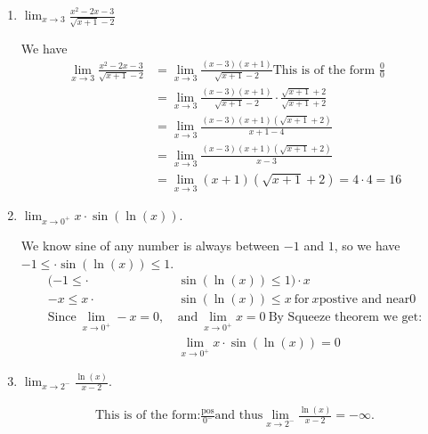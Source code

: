 \documentclass[nooutcomes]{ximera}
\begin{document}
\begin{problem}
	\begin{enumerate}
  \item
      $\displaystyle \lim_{x \to 3} \frac{x^2 - 2x - 3}{\sqrt{x+1} - 2}$
      \begin{freeResponse}
        We have
        \begin{align*}
          \lim_{x \to 3} \frac{x^2 - 2x - 3}{\sqrt{x+1} - 2} &= \lim_{x \to 3} \frac{(x- 3)(x + 1)}{\sqrt{x+1} - 2} \text{This is of the form $\frac{0}{0}$} \\
          &= \lim_{x \to 3} \frac{(x- 3)(x + 1)}{\sqrt{x+1} - 2} \cdot \frac{\sqrt{x+1} + 2}{\sqrt{x+1} + 2}\\
          &= \lim_{x \to 3} \frac{(x- 3)(x + 1)(\sqrt{x+1} + 2)}{x+1 - 4}\\
          &= \lim_{x \to 3} \frac{(x- 3)(x + 1)(\sqrt{x+1} + 2)}{x-3}\\
          &= \lim_{x \to 3} (x + 1)(\sqrt{x+1} + 2) = 4 \cdot 4 = 16
        \end{align*}
      \end{freeResponse}


    \item
      $\displaystyle \lim_{x \to 0^+} x \cdot \sin(\ln(x))$.
      \begin{freeResponse}
	We know sine of any number is always between $-1$ and $1$, so we have $-1 \le  \cdot \sin(\ln(x)) \le 1$.
	\begin{align*}
	(-1 \le  \cdot& \sin(\ln(x)) \le 1) \cdot x\\
       	-x \le x \cdot& \sin(\ln(x)) \le x\ \text{for}\ x \text{postive and near} 0\\
	\text{Since}\ \lim_{x \to 0^+} -x = 0,\ &\text{and}\ \lim_{x \to 0^+} x = 0\ \text{By Squeeze theorem we get:}\\
          &\lim_{x \to 0^+} x \cdot \sin(\ln(x)) = 0
 		\end{align*}
      \end{freeResponse}


    \item
      $\displaystyle \lim_{x \to 2^-} \frac{\ln(x)}{x - 2}$.
      \begin{freeResponse}
       
        \begin{align*}
        	\text{This is of the form:}\frac{\text{pos}}{0^-} \text{and thus} \lim_{x \to 2^-} \frac{\ln(x)}{x - 2} = -\infty.
        \end{align*}
      \end{freeResponse}
  \end{enumerate} 
\end{problem}
\end{document}

